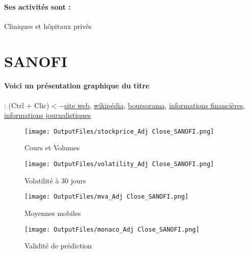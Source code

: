 \documentclass[11pt,a4paper]{report}%
\begin{document}
\paragraph{Ses activités sont : } Cliniques et hôpitaux privés 
    
    \newpage

\section{SANOFI}

\paragraph{Voici un présentation graphique du titre} : (Ctrl + Clic)$<-$\href{https://www.sanofi.com/fr/investisseurs/}{site web}, \href{https://fr.wikipedia.org/wiki/Sanofi}{wikipédia}, \href{https://www.boursorama.com/cours/1rPSAN}{boursorama}, \href{https://www.qwant.com/?q=site:https:%2f%2fwww.easybourse.com%2faction-societe%2fSANOFI&t=web&client=ext-firefox-hp}{informations financières}, \href{https://bourse.lerevenu.com/cours-de-bourse/fiche-valeur-synthese/SANOFI/SAN-FR}{informations journalistiques}
\begin{figure}[!htb]
   \begin{minipage}{0.5\textwidth}
     \centering
     \texttt{[image: OutputFiles/stockprice\_Adj Close\_SANOFI.png]}
     \caption{Cours et Volumes}\label{Fig:price_SANOFI}
   \end{minipage}\hfill
   \begin{minipage}{0.5\textwidth}
     \centering
     \texttt{[image: OutputFiles/volatility\_Adj Close\_SANOFI.png]}
     \caption{Volatilité à 30 jours}\label{Fig:volat_SANOFI}
   \end{minipage}
\end{figure}
\begin{figure}[!htb]
   \begin{minipage}{0.5\textwidth}
     \centering
     \texttt{[image: OutputFiles/mva\_Adj Close\_SANOFI.png]}
     \caption{Moyennes mobiles}\label{Fig:mva_SANOFI}
   \end{minipage}\hfill
   \begin{minipage}{0.5\textwidth}
     \centering
     \texttt{[image: OutputFiles/monaco\_Adj Close\_SANOFI.png]}
     \caption{Validité de prédiction}\label{Fig:prediction_SANOFI}
   \end{minipage}
\end{figure}
\end{document}
